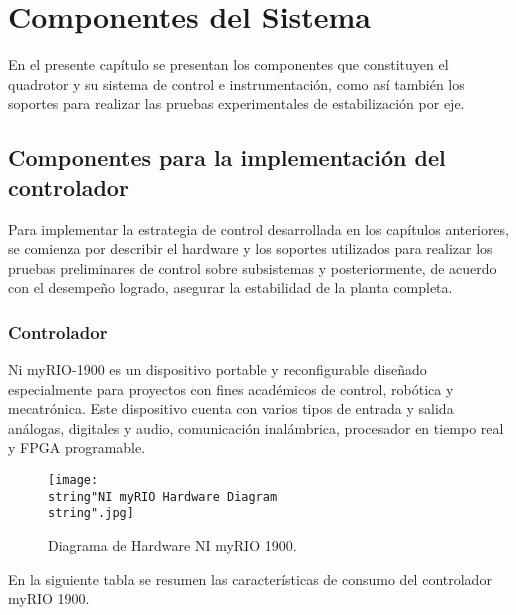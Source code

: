 \documentclass[\main/main.tex]{subfiles}
\begin{document}
\section{Componentes del Sistema}\label{Componentes del Sistema}

En el presente capítulo se presentan los componentes que constituyen el quadrotor y su sistema de control e instrumentación, como así también los soportes para realizar las pruebas experimentales de estabilización por eje.


\subsection{Componentes para la implementación del controlador}

Para implementar la estrategia de control desarrollada en los capítulos
anteriores, se comienza por describir el hardware y los soportes utilizados
para realizar los pruebas preliminares de control sobre subsistemas
y posteriormente, de acuerdo con el desempeño logrado, asegurar la
estabilidad de la planta completa.


\subsubsection{Controlador }

Ni myRIO-1900 es un dispositivo portable y reconfigurable diseñado
especialmente para proyectos con fines académicos de control, robótica
y mecatrónica. Este dispositivo cuenta con varios tipos de entrada
y salida análogas, digitales y audio, comunicación inalámbrica, procesador
en tiempo real y FPGA programable. 

\begin{figure}[H]
\noindent \begin{centering}
\texttt{[image: \\string"NI myRIO Hardware Diagram\\string".jpg]}
\par\end{centering}
\caption{Diagrama de Hardware NI myRIO 1900.}
\end{figure}

\textcompwordmark{}

En la siguiente tabla se resumen las características de consumo del
controlador myRIO 1900.
\end{document}
